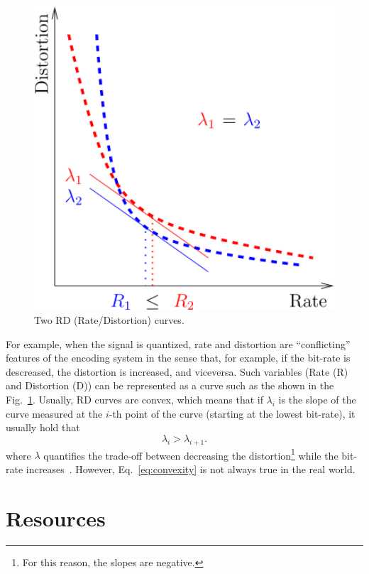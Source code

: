 \begin{figure}
  \centering
  \includegraphics[width=1.0\textwidth]{graphics/RD_slopes} 
  \caption{Two RD (Rate/Distortion) curves.}
  \label{fig:RD_slopes}
\end{figure}

For example, when the signal is quantized, rate and distortion are
``conflicting'' features of the encoding system in the sense that, for
example, if the bit-rate is descreased, the distortion is increased,
and viceversa. Such variables (Rate (R) and Distortion (D)) can be
represented as a curve such as the shown in the
Fig.~\ref{fig:RD_slopes}. Usually, RD curves are convex, which means
that if $\lambda_i$ is the slope of the curve measured at the $i$-th
point of the curve (starting at the lowest bit-rate), it usually hold
that
\begin{equation}
  \lambda_i > \lambda_{i+1}.
  \label{eq:convexity}
\end{equation}
where $\lambda$ quantifies the trade-off between decreasing the
distortion\footnote{For this reason, the slopes are negative.} while
the bit-rate
increases~\cite{vetterli1995wavelets,sayood2017introduction}. However,
Eq.~\eqref{eq:convexity} is not always true in the real world.


\section{Resources}
\renewcommand{\addcontentsline}[3]{}%

